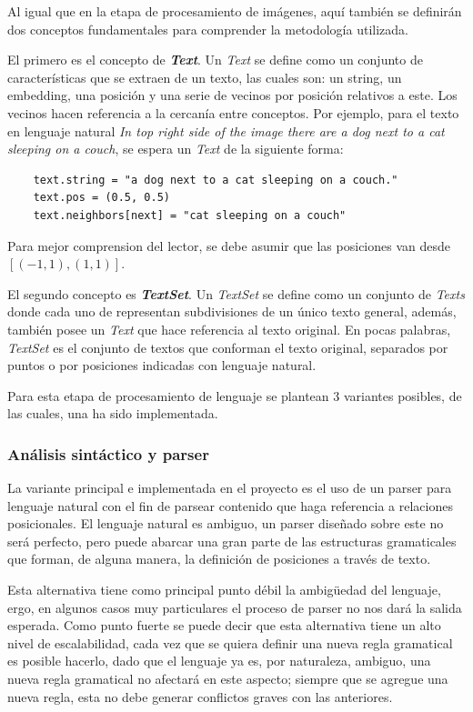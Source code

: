 Al igual que en la etapa de procesamiento de imágenes, aquí también se definirán dos conceptos fundamentales para comprender la metodología utilizada.

El primero es el concepto de \textit{\textbf{Text}}. Un \textit{Text} se define como un conjunto de características que se extraen de un texto, las cuales son: un string, un embedding, una posición y una serie de vecinos por posición relativos a este. Los vecinos hacen referencia a la cercanía entre conceptos. Por ejemplo, para el texto en lenguaje natural \textit{In top right side of the image there are a dog next to a cat sleeping on a couch}, se espera un \textit{Text} de la siguiente forma:

\begin{verbatim}
    text.string = "a dog next to a cat sleeping on a couch."
    text.pos = (0.5, 0.5)
    text.neighbors[next] = "cat sleeping on a couch"
\end{verbatim}

Para mejor comprension del lector, se debe asumir que las posiciones van desde $[(-1,1), (1,1)]$.

El segundo concepto es \textit{\textbf{TextSet}}. Un \textit{TextSet} se define como un conjunto de \textit{Texts} donde cada uno de representan subdivisiones de un \'unico texto general, además, también posee un \textit{Text} que hace referencia al texto original. En pocas palabras, \textit{TextSet} es el conjunto de textos que conforman el texto original, separados por puntos o por posiciones indicadas con lenguaje natural.

Para esta etapa de procesamiento de lenguaje se plantean 3 variantes posibles, de las cuales, una ha sido implementada.

\subsubsection{Análisis sintáctico y parser}
La variante principal e implementada en el proyecto es el uso de un parser para lenguaje natural con el fin de parsear contenido que haga referencia a relaciones posicionales. El lenguaje natural es ambiguo, un parser diseñado sobre este no será perfecto, pero puede abarcar una gran parte de las estructuras gramaticales que forman, de alguna manera, la definición de posiciones a través de texto.

Esta alternativa tiene como principal punto débil la ambigüedad del lenguaje, ergo, en algunos casos muy particulares el proceso de parser no nos dará la salida esperada. Como punto fuerte se puede decir que esta alternativa tiene un alto nivel de escalabilidad, cada vez que se quiera definir una nueva regla gramatical es posible hacerlo, dado que el lenguaje ya es, por naturaleza, ambiguo, una nueva regla gramatical no afectará en este aspecto; siempre que se agregue una nueva regla, esta no debe generar conflictos graves con las anteriores.

